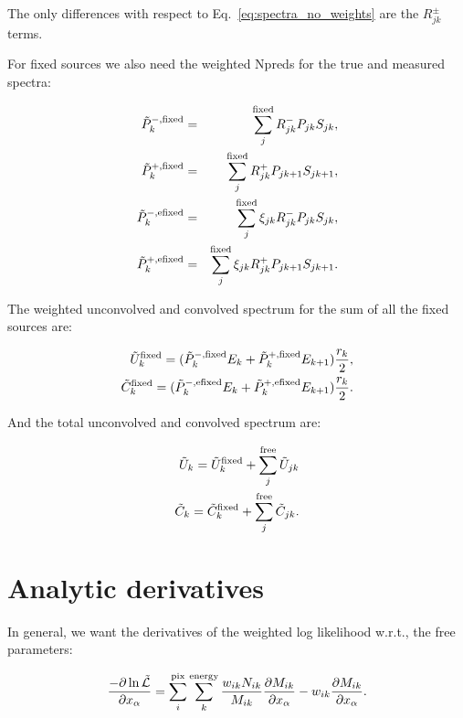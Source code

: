\documentclass[preprint]{aastex}
\begin{document}
\noindent The only differences with respect to Eq.~\ref{eq:spectra_no_weights} 
are the $R_{jk}^{\pm}$ terms.  

For fixed sources we also need the weighted Npreds for the
true and measured spectra:

\begin{eqnarray}
  \tilde{P}_{k}^{-, \rm fixed} & = & \sum_j^{\rm fixed} R_{jk}^{-} P_{jk} S_{jk},  \nonumber \\
  \tilde{P}_{k}^{+, \rm fixed} & = & \sum_j^{\rm fixed} R_{jk}^{+} P_{jk+1} S_{jk+1},  \nonumber \\
  \tilde{P}_{k}^{-, \rm efixed} & = & \sum_j^{\rm fixed} \xi_{jk} R_{jk}^{-} P_{jk} S_{jk},  \nonumber \\
  \tilde{P}_{k}^{+, \rm efixed} & = & \sum_j^{\rm fixed} \xi_{jk} R_{jk}^{+} P_{jk+1} S_{jk+1}.  
\end{eqnarray}

\noindent The weighted unconvolved and convolved spectrum for the sum
of all the fixed sources are:

\begin{eqnarray}
  \tilde{U}_{k}^{\rm fixed} = ( \tilde{P}_{k}^{-, \rm fixed} E_k + \tilde{P}_{k}^{+, \rm fixed} E_{k+1} )  \frac{r_k}{2},  \nonumber \\
  \tilde{C}_{k}^{\rm fixed} = ( \tilde{P}_{k}^{-, \rm efixed} E_k + \tilde{P}_{k}^{+, \rm efixed} E_{k+1} )  \frac{r_k}{2}.
\end{eqnarray}

\noindent And the total unconvolved and convolved spectrum are:

\begin{eqnarray}
  \tilde{U}_{k} = \tilde{U}_{k}^{\rm fixed} + \sum_j^{\rm free} \tilde{U}_{jk} \nonumber \\
  \tilde{C}_{k} = \tilde{C}_{k}^{\rm fixed} + \sum_j^{\rm free} \tilde{C}_{jk}.
\end{eqnarray}


\section{Analytic derivatives}\label{sec:derivatives}

In general, we want the derivatives of the weighted log likelihood w.r.t.,
the free parameters:

\begin{equation}\label{eq:derivatives}
  \frac{-\partial \ln \tilde{\mathcal{L}}}{\partial x_{\alpha}} = \sum_i^{\rm pix} \sum_k^{\rm energy} \frac{w_{ik} N_{ik}}{M_{ik}} \frac{\partial M_{ik}}{\partial x_{\alpha}} - w_{ik} \frac{\partial M_{ik}}{\partial x_{\alpha}}.
\end{equation}
\end{document}
